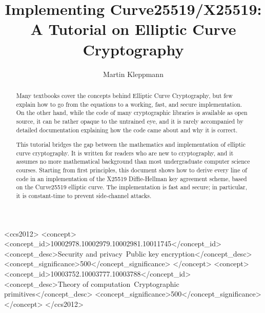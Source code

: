 \documentclass[manuscript]{acmart}
\begin{document}
\def\listingautorefname{Listing}%
\def\sectionautorefname{Section}%
\def\subsectionautorefname{Section}%
\def\subsubsectionautorefname{Section}%

\title{Implementing Curve25519/X25519: A Tutorial on Elliptic Curve Cryptography}

\author{Martin Kleppmann}

\begin{abstract}
Many textbooks cover the concepts behind Elliptic Curve Cryptography, but few explain how to go from the equations to a working, fast, and secure implementation.
On the other hand, while the code of many cryptographic libraries is available as open source, it can be rather opaque to the untrained eye, and it is rarely accompanied by detailed documentation explaining how the code came about and why it is correct.

This tutorial bridges the gap between the mathematics and implementation of elliptic curve cryptography.
It is written for readers who are new to cryptography, and it assumes no more mathematical background than most undergraduate computer science courses.
Starting from first principles, this document shows how to derive every line of code in an implementation of the X25519 Diffie-Hellman key agreement scheme, based on the Curve25519 elliptic curve.
The implementation is fast and secure; in particular, it is constant-time to prevent side-channel attacks.
\end{abstract}

\begin{CCSXML}
<ccs2012>
   <concept>
       <concept_id>10002978.10002979.10002981.10011745</concept_id>
       <concept_desc>Security and privacy~Public key encryption</concept_desc>
       <concept_significance>500</concept_significance>
       </concept>
   <concept>
       <concept_id>10003752.10003777.10003788</concept_id>
       <concept_desc>Theory of computation~Cryptographic primitives</concept_desc>
       <concept_significance>500</concept_significance>
       </concept>
 </ccs2012>
\end{CCSXML}

\end{document}
